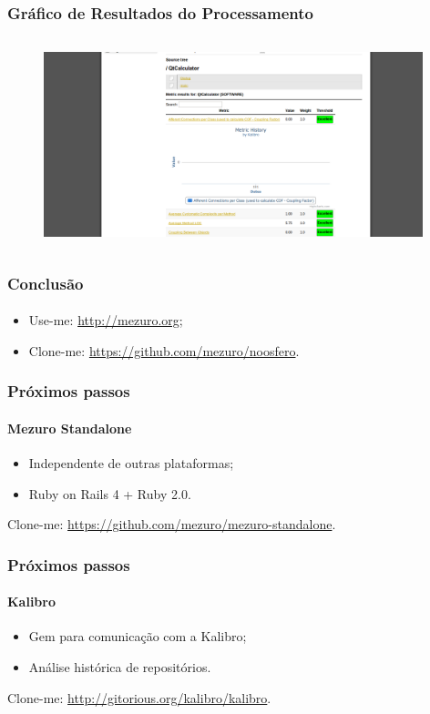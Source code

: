 \documentclass{beamer}
\begin{document}
    \begin{frame}
      \frametitle{Gráfico de Resultados do Processamento}
      \framesubtitle{}
    
      \begin{figure}
        \begin{center}
          \includegraphics[width=11cm, height=6cm]{images/10-processing-results-graphic.png}
          \label{fig:processing-results-graphic}
        \end{center}
      \end{figure}
    \end{frame}
  
  \begin{frame}
    \frametitle{Conclusão}
    \framesubtitle{}
    
    \begin{itemize}
      \item Use-me: \url{http://mezuro.org};
      \item Clone-me: \url{https://github.com/mezuro/noosfero}.
    \end{itemize}
  \end{frame}
  
  \begin{frame}
    \frametitle{Próximos passos}
    \framesubtitle{Mezuro Standalone}
  
    \begin{itemize}
      \item Independente de outras plataformas;
      \item Ruby on Rails 4 + Ruby 2.0.
    \end{itemize}
    
    Clone-me: \url{https://github.com/mezuro/mezuro-standalone}.
  \end{frame}
  
    \begin{frame}
    \frametitle{Próximos passos}
    \framesubtitle{Kalibro}
  
    \begin{itemize}
      \item Gem para comunicação com a Kalibro;
      \item Análise histórica de repositórios.
    \end{itemize}
    
    Clone-me: \url{http://gitorious.org/kalibro/kalibro}.
  \end{frame}
  
\end{document}
